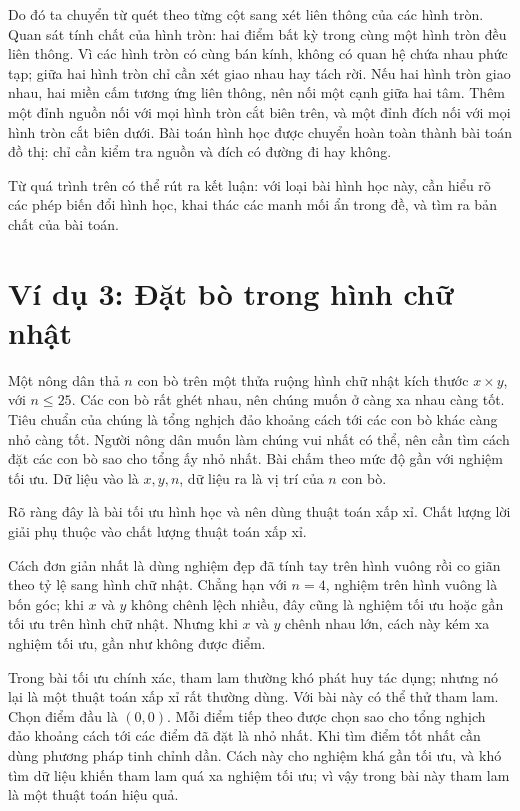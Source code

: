 \documentclass[11pt]{article}
\begin{document}
Do đó ta chuyển từ quét theo từng cột sang xét liên thông của các hình tròn.
Quan sát tính chất của hình tròn: hai điểm bất kỳ trong cùng một hình tròn
đều liên thông. Vì các hình tròn có cùng bán kính, không có quan hệ chứa nhau
phức tạp; giữa hai hình tròn chỉ cần xét giao nhau hay tách rời. Nếu hai hình
tròn giao nhau, hai miền cấm tương ứng liên thông, nên nối một cạnh giữa hai
tâm. Thêm một đỉnh nguồn nối với mọi hình tròn cắt biên trên, và một đỉnh
đích nối với mọi hình tròn cắt biên dưới. Bài toán hình học được chuyển hoàn
toàn thành bài toán đồ thị: chỉ cần kiểm tra nguồn và đích có đường đi hay
không.

Từ quá trình trên có thể rút ra kết luận: với loại bài hình học này, cần hiểu
rõ các phép biến đổi hình học, khai thác các manh mối ẩn trong đề, và tìm ra
bản chất của bài toán.

\section{Ví dụ 3: Đặt bò trong hình chữ nhật}

Một nông dân thả \(n\) con bò trên một thửa ruộng hình chữ nhật kích thước
\(x\times y\), với \(n\le25\). Các con bò rất ghét nhau, nên chúng muốn ở càng
xa nhau càng tốt. Tiêu chuẩn của chúng là tổng nghịch đảo khoảng cách tới các
con bò khác càng nhỏ càng tốt. Người nông dân muốn làm chúng vui nhất có thể,
nên cần tìm cách đặt các con bò sao cho tổng ấy nhỏ nhất. Bài chấm theo mức
độ gần với nghiệm tối ưu. Dữ liệu vào là \(x,y,n\), dữ liệu ra là vị trí của
\(n\) con bò.

Rõ ràng đây là bài tối ưu hình học và nên dùng thuật toán xấp xỉ. Chất lượng
lời giải phụ thuộc vào chất lượng thuật toán xấp xỉ.

Cách đơn giản nhất là dùng nghiệm đẹp đã tính tay trên hình vuông rồi co giãn
theo tỷ lệ sang hình chữ nhật. Chẳng hạn với \(n=4\), nghiệm trên hình vuông
là bốn góc; khi \(x\) và \(y\) không chênh lệch nhiều, đây cũng là nghiệm tối
ưu hoặc gần tối ưu trên hình chữ nhật. Nhưng khi \(x\) và \(y\) chênh nhau
lớn, cách này kém xa nghiệm tối ưu, gần như không được điểm.

Trong bài tối ưu chính xác, tham lam thường khó phát huy tác dụng; nhưng nó
lại là một thuật toán xấp xỉ rất thường dùng. Với bài này có thể thử tham
lam. Chọn điểm đầu là \((0,0)\). Mỗi điểm tiếp theo được chọn sao cho tổng
nghịch đảo khoảng cách tới các điểm đã đặt là nhỏ nhất. Khi tìm điểm tốt nhất
cần dùng phương pháp tinh chỉnh dần. Cách này cho nghiệm khá gần tối ưu, và
khó tìm dữ liệu khiến tham lam quá xa nghiệm tối ưu; vì vậy trong bài này
tham lam là một thuật toán hiệu quả.
\end{document}
